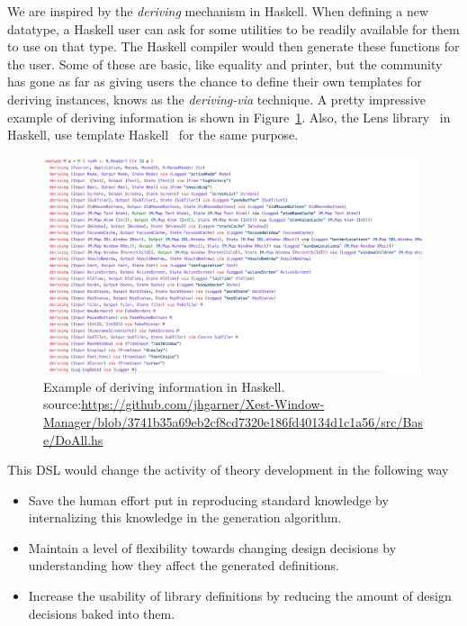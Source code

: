 We are inspired by the \emph{deriving} mechanism in Haskell. When defining a new datatype, a Haskell user can ask for some utilities to be readily available for them to use on that type. The Haskell compiler would then generate these functions for the user. Some of these are basic, like equality and printer, but the community has gone as far as giving users the chance to define their own templates for deriving instances, knows as the \emph{deriving-via} technique. A pretty impressive example of deriving information is shown in Figure~\ref{fig:deriving-via-example}. 
Also, the Lens library~\cite{lensesLib} in Haskell, use template Haskell~\cite{sheard2002TH} for the same purpose. 
\begin{figure}
    \includegraphics[scale=0.5,width=\linewidth]{figures/deriving-via-example.png}
    \caption{Example of deriving information in Haskell. source:\url{https://github.com/jhgarner/Xest-Window-Manager/blob/3741b35a69eb2cf8cd7320e186fd40134d1c1a56/src/Base/DoAll.hs}}
    \label{fig:deriving-via-example}
\end{figure}

This DSL would change the activity of theory development in the following way 
\begin{itemize}
    \item Save the human effort put in reproducing standard knowledge by internalizing this knowledge in the generation algorithm.
    \item Maintain a level of flexibility towards changing design decisions by understanding how they affect the generated definitions.
    \item Increase the usability of library definitions by reducing the amount of design decisions baked into them. 
\end{itemize}  


